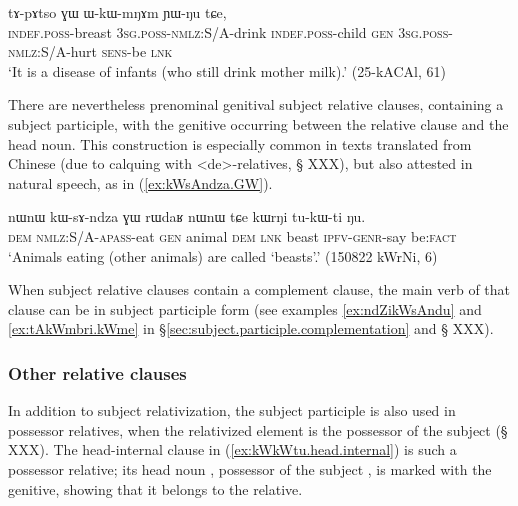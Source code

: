 \begin{exe}
\ex \label{ex:tWnW.WkWtshi}
 \gll  [tɯ-nɯ ɯ-kɯ-tsʰi] tɤ-pɤtso ɣɯ ɯ-kɯ-mŋɤm ɲɯ-ŋu tɕe, \\
 \textsc{indef}.\textsc{poss}-breast \textsc{3sg}.\textsc{poss}-\textsc{nmlz}:S/A-drink \textsc{indef}.\textsc{poss}-child \textsc{gen} \textsc{3sg}.\textsc{poss}-\textsc{nmlz}:S/A-hurt \textsc{sens}-be \textsc{lnk} \\
 \glt `It is a disease of infants (who still drink mother milk).' (25-kACAl, 61)
\end{exe}

There are nevertheless prenominal genitival subject relative clauses, containing a subject participle, with the genitive  occurring between the relative clause and the head noun. This construction is especially common in texts translated from Chinese (due to calquing with  <de>-relatives, § XXX), but also attested in natural speech, as in (\ref{ex:kWsAndza.GW}).

\begin{exe}
\ex \label{ex:kWsAndza.GW}
 \gll nɯnɯ kɯ-sɤ-ndza ɣɯ rɯdaʁ nɯnɯ tɕe kɯrŋi tu-kɯ-ti ŋu.  \\
 \textsc{dem} \textsc{nmlz}:S/A-\textsc{apass}-eat \textsc{gen} animal \textsc{dem} \textsc{lnk} beast \textsc{ipfv}-\textsc{genr}-say be:\textsc{fact} \\
 \glt `Animals eating (other animals) are called `beasts'.' (150822 kWrNi, 6)
\end{exe}


When subject relative clauses contain a complement clause, the main verb of that clause can be in subject participle form (see examples \ref{ex:ndZikWsAndu} and \ref{ex:tAkWmbri.kWme} in §\ref{sec:subject.participle.complementation} and § XXX).
 
\subsubsection{Other relative clauses}  \label{sec:subject.participle.other.relative}
In addition to subject relativization, the subject participle is also used in possessor relatives, when the relativized element is the possessor of the subject (§ XXX).  The head-internal clause in (\ref{ex:kWkWtu.head.internal}) is such a possessor relative; its head noun , possessor of the subject ,  is marked with the genitive, showing that it belongs to the relative.  

